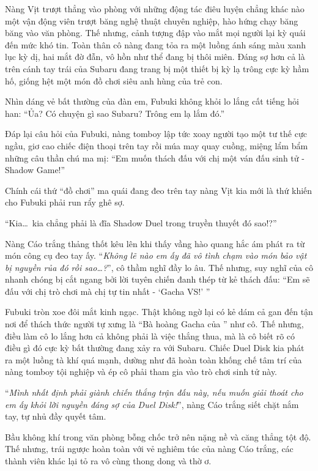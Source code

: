 \documentclass[../main.tex]{subfiles}
\begin{document}
\chrint

Nàng Vịt trượt thẳng vào phòng với những động tác điêu luyện chẳng khác nào một vận động viên trượt băng nghệ thuật chuyên nghiệp, hào hứng chạy băng băng vào văn phòng. Thế nhưng, cảnh tượng đập vào mắt mọi người lại kỳ quái đến mức khó tin. Toàn thân cô nàng đang tỏa ra một luồng ánh sáng màu xanh lục kỳ dị, hai mắt đờ đẫn, vô hồn như thể đang bị thôi miên. Đáng sợ hơn cả là trên cánh tay trái của Subaru đang trang bị một thiết bị kỳ lạ trông cực kỳ hầm hố, giống hệt một món đồ chơi siêu anh hùng của trẻ con.


Nhìn dáng vẻ bất thường của đàn em, Fubuki không khỏi lo lắng cất tiếng hỏi han: ``Ủa? Có chuyện gì sao Subaru? Trông em lạ lắm đó.''

Đáp lại câu hỏi của Fubuki, nàng tomboy lập tức xoay người tạo một tư thế cực ngầu, giơ cao chiếc điện thoại trên tay rồi múa may quay cuồng, miệng lẩm bẩm những câu thần chú ma mị: ``Em muốn thách đấu với chị một ván đấu sinh tử - Shadow Game!''

Chính cái thứ ``đồ chơi'' ma quái đang đeo trên tay nàng Vịt kia mới là thứ khiến cho Fubuki phải run rẩy ghê sợ.

``Kia\dots\ kia chẳng phải là đĩa Shadow Duel trong truyền thuyết đó sao!?''

Nàng Cáo trắng thảng thốt kêu lên khi thấy vầng hào quang hắc ám phát ra từ món công cụ đeo tay ấy. ``\textit{Không lẽ nào em ấy đã vô tình chạm vào món bảo vật bị nguyền rủa đó rồi sao\dots?}'', cô thầm nghĩ đầy lo âu. Thế nhưng, suy nghĩ của cô nhanh chóng bị cắt ngang bởi lời tuyên chiến đanh thép từ kẻ thách đấu: ``Em sẽ đấu với chị trò chơi mà chị tự tin nhất - `Gacha VS!' ''

Fubuki tròn xoe đôi mắt kinh ngạc. Thật không ngờ lại có kẻ dám cả gan đến tận nơi để thách thức người tự xưng là ``Bà hoàng Gacha của \hll'' như cô. Thế nhưng, điều làm cô lo lắng hơn cả không phải là việc thắng thua, mà là cô biết rõ có điều gì đó cực kỳ bất thường đang xảy ra với Subaru. Chiếc Duel Disk kia phát ra một luồng tà khí quá mạnh, dường như đã hoàn toàn khống chế tâm trí của nàng tomboy tội nghiệp và ép cô phải tham gia vào trò chơi sinh tử này.

``\textit{Mình nhất định phải giành chiến thắng trận đấu này, nếu muốn giải thoát cho em ấy khỏi lời nguyền đáng sợ của Duel Disk!}'', nàng Cáo trắng siết chặt nắm tay, tự nhủ đầy quyết tâm.

Bầu không khí trong văn phòng bỗng chốc trở nên nặng nề và căng thẳng tột độ. Thế nhưng, trái ngược hoàn toàn với vẻ nghiêm túc của nàng Cáo trắng, các thành viên khác lại tỏ ra vô cùng thong dong và thờ ơ.
\end{document}
